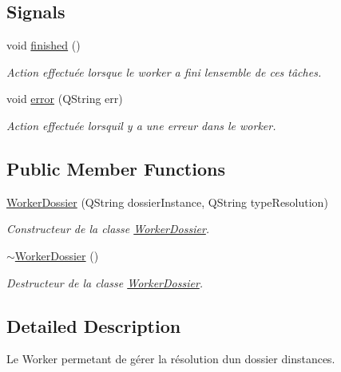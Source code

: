 \subsection*{Signals}
\begin{DoxyCompactItemize}
\item 
void \hyperlink{classWorkerDossier_aef696bfd03c464295dc80fb1fc9f71da}{finished} ()
\begin{DoxyCompactList}\small\item\em Action effectuée lorsque le worker a fini l\textquotesingle{}ensemble de ces tâches. \end{DoxyCompactList}\item 
void \hyperlink{classWorkerDossier_afb02d04b47bb81450661cbc36ad25902}{error} (Q\+String err)
\begin{DoxyCompactList}\small\item\em Action effectuée lorsqu\textquotesingle{}il y a une erreur dans le worker. \end{DoxyCompactList}\end{DoxyCompactItemize}
\subsection*{Public Member Functions}
\begin{DoxyCompactItemize}
\item 
\hyperlink{classWorkerDossier_ae62defa93ef94862572fda95736a03ed}{Worker\+Dossier} (Q\+String dossier\+Instance, Q\+String type\+Resolution)
\begin{DoxyCompactList}\small\item\em Constructeur de la classe \hyperlink{classWorkerDossier}{Worker\+Dossier}. \end{DoxyCompactList}\item 
\hyperlink{classWorkerDossier_ac2d339dcdd7e35d1fed6debf3495f904}{$\sim$\+Worker\+Dossier} ()
\begin{DoxyCompactList}\small\item\em Destructeur de la classe \hyperlink{classWorkerDossier}{Worker\+Dossier}. \end{DoxyCompactList}\end{DoxyCompactItemize}


\subsection{Detailed Description}
Le Worker permetant de gérer la résolution d\textquotesingle{}un dossier d\textquotesingle{}instances. 

